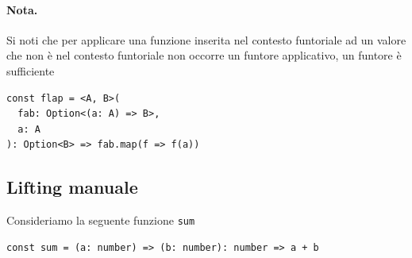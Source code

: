 \documentclass[12pt]{article}
\begin{document}









\paragraph{Nota. } Si noti che per applicare una funzione inserita nel contesto funtoriale ad un valore
che non è nel contesto funtoriale non occorre un funtore applicativo, un funtore è sufficiente

\begin{verbatim}
const flap = <A, B>(
  fab: Option<(a: A) => B>,
  a: A
): Option<B> => fab.map(f => f(a))
\end{verbatim}

\subsection{Lifting manuale}

Consideriamo la seguente funzione \texttt{sum}

\begin{verbatim}
const sum = (a: number) => (b: number): number => a + b
\end{verbatim}
\end{document}
